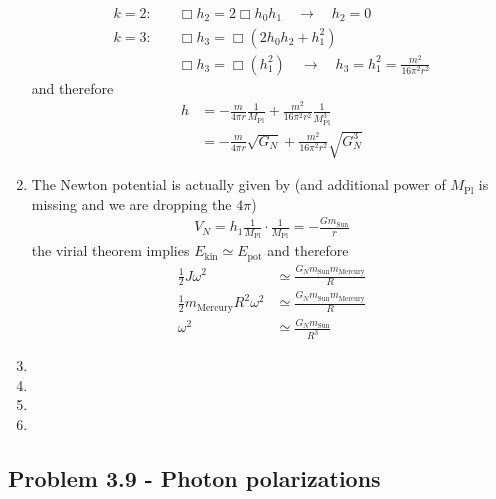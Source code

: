 \documentclass[10pt,a4paper]{book}
\theoremstyle{definition}
\begin{document}
\begin{enumerate}[label=(\alph*)]
\begin{align}
k=2:&\quad\Box h_2=2\Box h_0h_1\quad\rightarrow\quad h_2=0\\
k=3:&\quad\Box h_3=\Box(2h_0h_2+h_1^2)\\
    &\quad\Box h_3=\Box(h_1^2)\quad\rightarrow\quad h_3=h_1^2=\frac{m^2}{16\pi^2r^2}
\end{align}
and therefore
\begin{align}
h&=-\frac{m}{4\pi r}\frac{1}{M_\text{Pl}}+\frac{m^2}{16\pi^2r^2}\frac{1}{M_\text{Pl}^3}\\
&=-\frac{m}{4\pi r}\sqrt{G_N}+\frac{m^2}{16\pi^2r^2}\sqrt{G_N^3}
\end{align}
\item 
The Newton potential is actually given by (and additional power of $M_\text{Pl}$ is missing and we are dropping the $4\pi$)
\begin{align}
V_N=h_1\frac{1}{M_\text{Pl}}\cdot\frac{1}{M_\text{Pl}}=-\frac{Gm_\text{Sun}}{r}
\end{align}
the virial theorem implies $E_\text{kin}\simeq E_\text{pot}$ and therefore
\begin{align}
\frac{1}{2}J\omega^2&\simeq \frac{G_N m_\text{Sun} m_\text{Mercury}}{R}\\
\frac{1}{2}m_\text{Mercury}R^2\omega^2&\simeq \frac{G_N m_\text{Sun} m_\text{Mercury}}{R}\\
\omega^2&\simeq\frac{G_Nm_\text{Sun}}{R^3}
\end{align}

\item 
\item 
\item 
\item 
\end{enumerate}

\subsection{Problem 3.9 - Photon polarizations}
\end{document}
